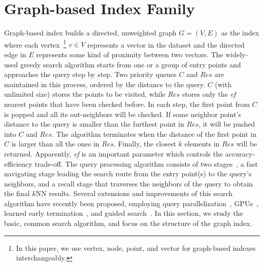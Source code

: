 \documentclass[11pt]{article}
\begin{document}
\section{Graph-based Index Family}
\label{zeyu_sec:graph}
Graph-based index builds a directed, unweighted graph $G=(V,E)$ as the index where each vertex~\footnote{In this paper, we use vertex, node, point, and vector for graph-based indexes interchangeably.} $v\in V$ represents a vector in the dataset and the directed edge in $E$ represents some kind of proximity between two vectors.
The widely-used greedy search algorithm starts from one or a group of entry points and approaches the query step by step. 
Two priority queues $C$ and $Res$ are maintained in this process, ordered by the distance to the query.
$C$ (with unlimited size) stores the points to be visited, while $Res$ stores only the \emph{ef} nearest points that have been checked before. 
In each step, the first point from $C$ is popped and all its out-neighbors will be checked. 
If some neighbor point's distance to the query is smaller than the furthest point in $Res$, it will be pushed into $C$ and $Res$.
The algorithm terminates when the distance of the first point in $C$ is larger than all the ones in $Res$.
Finally, the closest $k$ elements in $Res$ will be returned.
Apparently, \emph{ef} is an important parameter which controls the accuracy-efficiency trade-off.
The query processing algorithm consists of two stages~\cite{note,kbs}, a fast navigating stage leading the search route from the entry point(s) to the query's neighbors, and a recall stage that traverses the neighbors of the query to obtain the final $k$NN results.
Several extensions and improvements of this search algorithm have recently been proposed, employing query parallelization~\cite{iqan}, GPUs~\cite{song,ganns}, learned early termination~\cite{early-termination}, and guided search~\cite{kbs}.
In this section, we study the basic, common search algorithm, and focus on the structure of the graph index.





\end{document}

